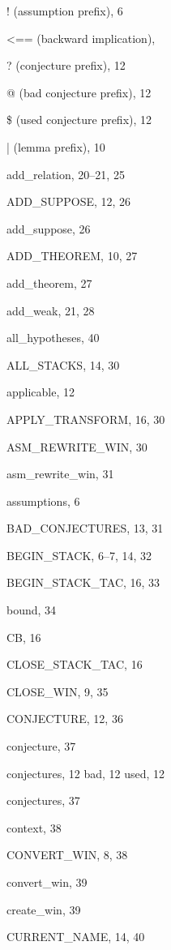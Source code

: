 \begin{theindex}

  \item {{\ptt !} (assumption prefix)}, 6
  \item {{\ptt <==} (backward implication)}, 
  \item {{\ptt ?} (conjecture prefix)}, 12
  \item {{\ptt @} (bad conjecture prefix)}, 12
  \item {{\ptt \$} (used conjecture prefix)}, 12
  \item {{\ptt |} (lemma prefix)}, 10

  \indexspace

  \item {\ptt add\_relation}, 20--21, 25
  \item {\ptt ADD\_SUPPOSE}, 12, 26
  \item {\ptt add\_suppose}, 26
  \item {\ptt ADD\_THEOREM}, 10, 27
  \item {\ptt add\_theorem}, 27
  \item {\ptt add\_weak}, 21, 28
  \item {\ptt all\_hypotheses}, 40
  \item {\ptt ALL\_STACKS}, 14, 30
  \item applicable, 12
  \item {\ptt APPLY\_TRANSFORM}, 16, 30
  \item {\ptt ASM\_REWRITE\_WIN}, 30
  \item {\ptt asm\_rewrite\_win}, 31
  \item assumptions, 6

  \indexspace

  \item {\ptt BAD\_CONJECTURES}, 13, 31
  \item {\ptt BEGIN\_STACK}, 6--7, 14, 32
  \item {\ptt BEGIN\_STACK\_TAC}, 16, 33
  \item {\ptt bound}, 34

  \indexspace

  \item {\ptt CB}, 16
  \item {\ptt CLOSE\_STACK\_TAC}, 16
  \item {\ptt CLOSE\_WIN}, 9, 35
  \item {\ptt CONJECTURE}, 12, 36
  \item {\ptt conjecture}, 37
  \item conjectures, 12
    \subitem bad, 12
    \subitem used, 12
  \item {\ptt conjectures}, 37
  \item {\ptt context}, 38
  \item {\ptt CONVERT\_WIN}, 8, 38
  \item {\ptt convert\_win}, 39
  \item {\ptt create\_win}, 39
  \item {\ptt CURRENT\_NAME}, 14, 40


\end{theindex}
